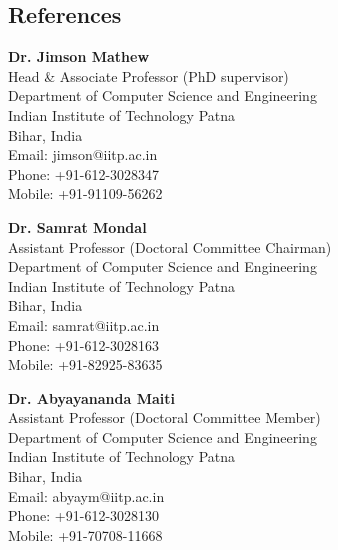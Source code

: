 \documentclass[mm]{simple_style}
\begin{document}
\begin{resume}
\section{References}

\textbf {Dr. Jimson Mathew}\\ 
Head \& Associate Professor (PhD supervisor)\\ 
Department of Computer Science and Engineering \\ 
Indian Institute of Technology Patna \\ 
Bihar, India\\
Email: jimson@iitp.ac.in \\
Phone: +91-612-3028347 \\
Mobile: +91-91109-56262 \\
\halfsectionline \vspace{-5mm}

\textbf {Dr. Samrat Mondal}\\ 
Assistant Professor (Doctoral Committee Chairman)\\ 
Department of Computer Science and Engineering \\ 
Indian Institute of Technology Patna \\ Bihar, India\\
Email: samrat@iitp.ac.in \\
Phone: +91-612-3028163 \\
Mobile: +91-82925-83635 \\
\halfsectionline \vspace{-5mm}

\textbf {Dr. Abyayananda Maiti}\\ 
Assistant Professor (Doctoral Committee Member)\\ 
Department of Computer Science and Engineering \\ 
Indian Institute of Technology Patna \\ Bihar, India\\
Email: abyaym@iitp.ac.in \\
Phone: +91-612-3028130 \\
Mobile: +91-70708-11668 \\
\sectionline

\end{resume}
\end{document}
